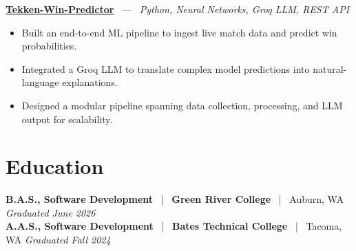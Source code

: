 \documentclass[10pt, letterpaper]{article}
\newcommand{\jobhead}[4]{%
  \vspace{5pt}%
  {\bfseries\color{dark}#1}%
  ~{\color{light}|}~%
  {\bfseries\color{navy}#2}%
  ~{\color{light}|}~%
  {\color{light}#3}%
  \hfill{\color{light}\small\textit{#4}}\\[-2pt]%
}
\newcommand{\projhead}[3]{%
  \vspace{5pt}%
  {\bfseries\color{dark}\href{#2}{#1}}%
  ~{\color{light}---}~%
  {\color{light}\small\textit{#3}}\\[-2pt]%
}
\begin{document}
\projhead{Tekken-Win-Predictor}{}{Python, Neural Networks, Groq LLM, REST API}
\begin{itemize}
  \item Built an end-to-end ML pipeline to ingest live match data and predict win probabilities.
  \item Integrated a Groq LLM to translate complex model predictions into natural-language explanations.
  \item Designed a modular pipeline spanning data collection, processing, and LLM output for scalability.
\end{itemize}

\section{Education}

\jobhead{B.A.S., Software Development}{Green River College}{Auburn, WA}{Graduated June 2026}
\jobhead{A.A.S., Software Development}{Bates Technical College}{Tacoma, WA}{Graduated Fall 2024}
\end{document}
